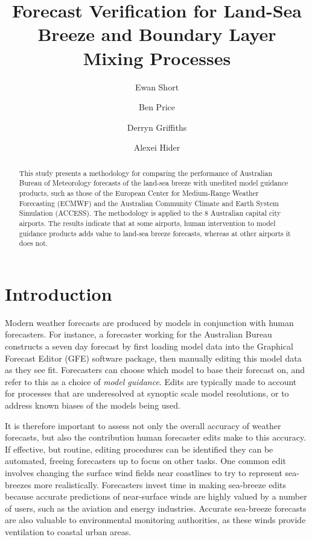 \documentclass[alpha-refs]{wiley-article}
\title{Forecast Verification for Land-Sea Breeze and Boundary Layer Mixing Processes}
\author[1]{Ewan Short}
\author[2]{Ben Price}
\author[3]{Derryn Griffiths}
\author[3]{Alexei Hider}
\affil[1]{ARC Centre of Excellence for Climate Extremes, School of Earth Sciences, University of Melbourne, Parkville, VIC, 3010, Australia}
\affil[2]{Bureau of Meteorology, Casuarina, NT, 0810, Australia}
\affil[3]{Bureau of Meteorology, Melbourne, VIC, 3208, Australia}
\begin{document}
\maketitle

\begin{abstract}
This study presents a methodology for comparing the performance of Australian Bureau of Meteorology forecasts of the land-sea breeze with unedited model guidance products, such as those of the European Center for Medium-Range Weather Forecasting (ECMWF) and the Australian Community Climate and Earth System Simulation (ACCESS). The methodology is applied to the 8 Australian capital city airports. The results indicate that at some airports, human intervention to model guidance products adds value to land-sea breeze forecasts, whereas at other airports it does not. 

\end{abstract}

\section{Introduction}\label{introduction}
Modern weather forecasts are produced by models in conjunction with human forecasters. For instance, a forecaster working for the Australian Bureau constructs a seven day forecast by first loading model data into the Graphical Forecast Editor (GFE) software package, then manually editing this model data as they see fit. Forecasters can choose which model to base their forecast on, and refer to this as a choice of \textit{model guidance}. Edits are typically made to account for processes that are underesolved at synoptic scale model resolutions, or to address known biases of the models being used. 

It is therefore important to assess not only the overall accuracy of weather forecasts, but also the contribution human forecaster edits make to this accuracy. If effective, but routine, editing procedures can be identified they can be automated, freeing forecasters up to focus on other tasks. One common edit involves changing the surface wind fields near coastlines to try to represent sea-breezes more realistically. Forecasters invest time in making sea-breeze edits because accurate predictions of near-surface winds are highly valued by a number of users, such as the aviation and energy \citep{smith09} industries. Accurate sea-breeze forecasts are also valuable to environmental monitoring authorities, as these winds provide ventilation to coastal urban areas.
\end{document}
